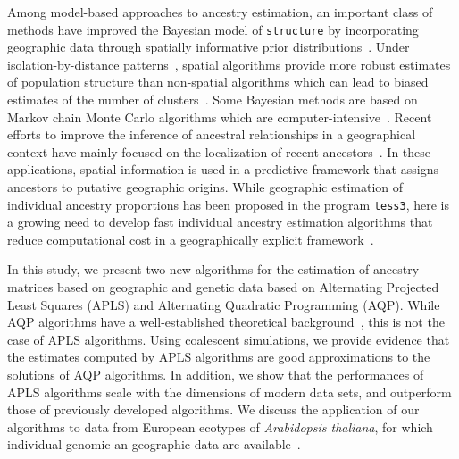   Among model-based approaches to ancestry estimation, an important class of methods have improved the Bayesian model of {\tt structure} by incorporating geographic data through spatially informative prior distributions~\citep{Chen2007, Corander2008}. Under isolation-by-distance patterns~\citep{Wright1943, Malecot1948}, spatial algorithms provide more robust estimates of population structure than non-spatial algorithms which can lead to biased estimates of the number of clusters~\citep{Durand2009}.  Some Bayesian methods are based on Markov chain Monte Carlo algorithms which are computer-intensive~\citep{Francois2010}. Recent efforts to improve the inference of ancestral relationships in a geographical context have mainly focused on the localization of recent ancestors~\citep{Baran2013, Lao2014, Yang2014}. In these applications, spatial information is used in a predictive framework that assigns ancestors to putative geographic origins.  While geographic estimation of individual ancestry proportions has been proposed in the program {\tt tess3}, here is a growing need to develop fast individual ancestry estimation algorithms that reduce computational cost in a geographically explicit framework~\citep{Caye2016}. 

In this study, we present two new algorithms for the estimation of ancestry matrices based on geographic and genetic data based on Alternating Projected Least Squares (APLS) and Alternating Quadratic Programming  (AQP). While AQP algorithms have a well-established theoretical background~\citep{Bertsekas1995}, this is not the case of APLS algorithms. Using coalescent simulations, we provide evidence that the estimates computed by APLS algorithms are good approximations to the solutions of AQP algorithms. In addition, we show that the performances of APLS algorithms scale with the dimensions of modern data sets, and outperform those of previously developed algorithms. We discuss the application of our algorithms to data from European ecotypes of {\it Arabidopsis thaliana}, for which individual genomic an geographic data are available~\citep{Horton2012}. 



